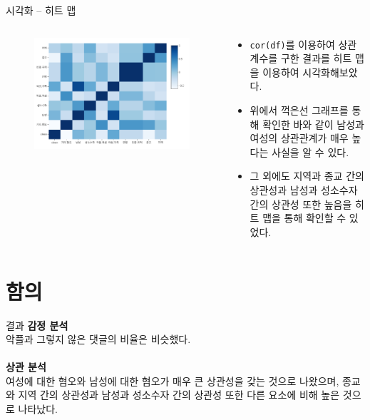 \documentclass[mathserif, aspectratio=169]{beamer}
\begin{document}
\begin{frame}{시각화 -- 히트 맵}
    \begin{columns}
        \begin{column}{0.5\linewidth}
            \centering
            \begin{figure}
                \includegraphics[width = \linewidth]{images/heatmap.pdf}
            \end{figure}
        \end{column}
        \begin{column}{0.5\linewidth}
            \justifying
            \begin{itemize}
                \justifying
                \item \texttt{cor(df)}를 이용하여 상관계수를 구한 결과를 히트 맵을 이용하여 시각화해보았다.
                \item 위에서 꺽은선 그래프를 통해 확인한 바와 같이 남성과 여성의 상관관계가 매우 높다는 사실을 알 수 있다.
                \item 그 외에도 지역과 종교 간의 상관성과 남성과 성소수자 간의 상관성 또한 높음을 히트 맵을 통해 확인할 수 있었다.
            \end{itemize}
        \end{column}
    \end{columns}
\end{frame}
\section{함의}
\begin{frame}{결과}
    \justifying
    \textbf{감정 분석}\\
    악플과 그렇지 않은 댓글의 비율은 비슷했다.\\~\\
    \textbf{상관 분석}\\
    여성에 대한 혐오와 남성에 대한 혐오가 매우 큰 상관성을 갖는 것으로 나왔으며, 
    종교와 지역 간의 상관성과 남성과 성소수자 간의 상관성 또한 다른 요소에 비해
    높은 것으로 나타났다.\\
\end{frame}
\end{document}
